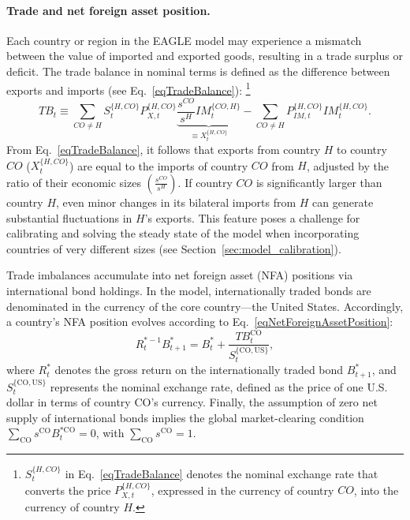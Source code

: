 \documentclass[a4paper,11pt]{article}
\numberwithin{equation}{section}
\begin{document}




\paragraph{Trade and net foreign asset position.} Each country or region in the EAGLE model may experience a mismatch between the value of imported and exported goods, resulting in a trade surplus or deficit. The trade balance in nominal terms is defined as the difference between exports and imports (see Eq.~\ref{eqTradeBalance}):
\footnote{
    $S_t^{\{H,CO\}}$ in Eq.~\ref{eqTradeBalance} denotes the nominal exchange rate that converts the price $P_{X,t}^{\{H,CO\}}$, expressed in the currency of country $CO$, into the currency of country $H$.
}
\begin{equation} \label{eqTradeBalance}
    TB_t \equiv \sum_{CO \neq H} S_t^{\{H,CO\}} P_{X,t}^{\{H,CO\}} \underbrace{\frac{s^{CO}}{s^H} IM_t^{\{CO,H\}}}_{\equiv X_t^{\{H,CO\}}} - \sum_{CO \neq H} P_{IM,t}^{\{H,CO\}} IM_t^{\{H,CO\}}.
\end{equation}
From Eq.~\ref{eqTradeBalance}, it follows that exports from country $H$ to country $CO$ ($X_t^{\{H,CO\}}$) are equal to the imports of country $CO$ from $H$, adjusted by the ratio of their economic sizes $\left(\frac{s^{CO}}{s^H}\right)$. If country $CO$ is significantly larger than country $H$, even minor changes in its bilateral imports from $H$ can generate substantial fluctuations in $H$'s exports. This feature poses a challenge for calibrating and solving the steady state of the model when incorporating countries of very different sizes (see Section~\ref{sec:model_calibration}).

Trade imbalances accumulate into net foreign asset (NFA) positions via international bond holdings.
In the model, internationally traded bonds are denominated in the currency of the core country---the United States.
Accordingly, a country's NFA position evolves according to Eq.~\ref{eqNetForeignAssetPosition}:
\begin{equation} \label{eqNetForeignAssetPosition}
    R_t^{*-1} B_{t+1}^* = B_t^* + \frac{TB_t^{\mathrm{CO}}}{S_t^{\{\mathrm{CO},\mathrm{US}\}}},
\end{equation}
where $R_t^*$ denotes the gross return on the internationally traded bond $B_{t+1}^*$, and $S_t^{\{\mathrm{CO},\mathrm{US}\}}$ represents the nominal exchange rate, defined as the price of one U.S. dollar in terms of country $\mathrm{CO}$'s currency. Finally, the assumption of zero net supply of international bonds implies the global market-clearing condition $\sum_{\mathrm{CO}} s^{\mathrm{CO}} B_t^{*\mathrm{CO}} = 0$, with $\sum_{\mathrm{CO}} s^{\mathrm{CO}} = 1$.
\end{document}
